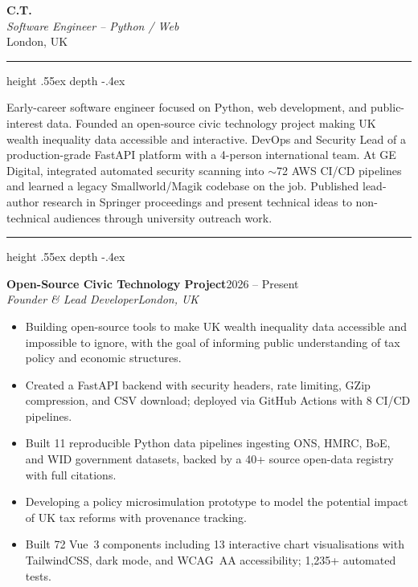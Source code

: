 \documentclass[11pt,a4paper]{article}
\newcommand{\cvsection}[1]{%
  \vspace{0.5em}%
  \noindent{\Large\itshape\color{hdr}#1}%
  \hspace{0.4em}%
  {\color{hdr}\leavevmode\leaders\hrule height .55ex depth -.4ex \hfill\kern0pt}%
  \par\vspace{0.15em}%
}
\newcommand{\entry}[4]{%
  \textbf{#1}\hfill#2\\
  \textit{#3}\hfill\textit{#4}\par\vspace{1pt}%
}
\begin{document}
{\LARGE\color{hdr}\textbf{C.T.}}\\[2pt]
{\itshape Software Engineer -- Python / Web}\\[2pt]
London, UK

\cvsection{Profile}

Early-career software engineer focused on Python, web development, and
public-interest data. Founded an open-source civic technology project
making UK wealth inequality data accessible and interactive. DevOps and
Security Lead of a production-grade FastAPI platform with a 4-person
international team. At GE Digital, integrated automated security scanning
into $\sim$72 AWS CI/CD pipelines and learned a legacy Smallworld/Magik
codebase on the job. Published lead-author research in Springer
proceedings and present technical ideas to non-technical audiences through
university outreach work.

\cvsection{Experience}

\entry{Open-Source Civic Technology Project}{2026 -- Present}
      {Founder \& Lead Developer}{London, UK}
\begin{itemize}
  \item Building open-source tools to make UK wealth inequality data
        accessible and impossible to ignore, with the goal of informing
        public understanding of tax policy and economic structures.
  \item Created a FastAPI backend with security headers, rate limiting,
        GZip compression, and CSV download; deployed via GitHub Actions
        with 8 CI/CD pipelines.
  \item Built 11 reproducible Python data pipelines ingesting ONS, HMRC,
        BoE, and WID government datasets, backed by a 40+ source
        open-data registry with full citations.
  \item Developing a policy microsimulation prototype to model the
        potential impact of UK tax reforms with provenance tracking.
  \item Built 72 Vue~3 components including 13 interactive chart
        visualisations with TailwindCSS, dark mode, and WCAG~AA
        accessibility; 1{,}235+ automated tests.
\end{itemize}
\end{document}
